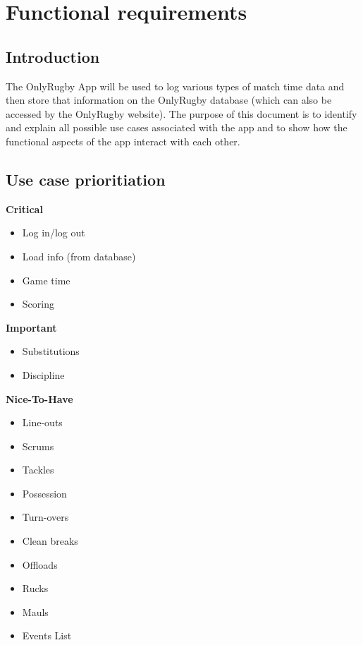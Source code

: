 \documentclass[a4paper,12pt]{report}
\begin{document}
\section{Functional requirements}
\subsection{Introduction}
The OnlyRugby App will be used to log various types of match time data and then store that information on the OnlyRugby database (which can also be accessed by the OnlyRugby website). The purpose of this document is to identify and explain all possible use cases associated with the app and to show how the functional aspects of the app interact with each other.
\subsection{Use case prioritiation}
\textbf{Critical} 
\begin{itemize}
  \item Log in/log out
  \item Load info (from database)
  \item Game time
  \item Scoring
\end{itemize}
\textbf{Important} 
\begin{itemize}
  \item Substitutions
  \item Discipline
\end{itemize}
\textbf{Nice-To-Have} 
\begin{itemize}
  \item Line-outs
  \item Scrums
  \item Tackles
  \item Possession 
  \item Turn-overs
  \item Clean breaks
  \item Offloads
  \item Rucks
  \item Mauls
  \item Events List
\end{itemize}
\newpage
\end{document}
